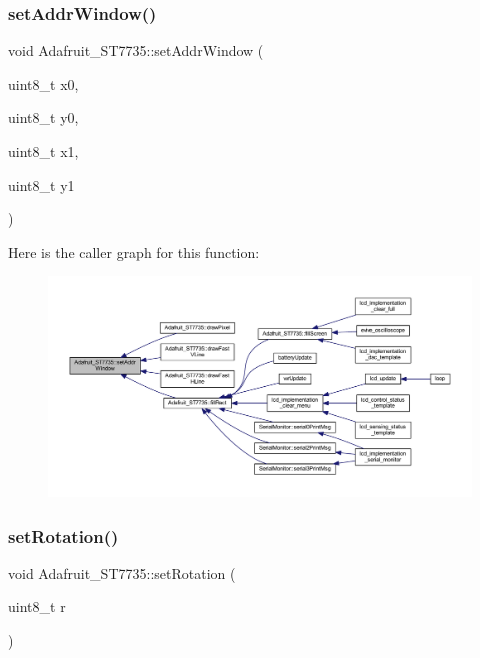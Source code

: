 \subsubsection{\texorpdfstring{set\+Addr\+Window()}{setAddrWindow()}}
{\footnotesize\ttfamily void Adafruit\+\_\+\+S\+T7735\+::set\+Addr\+Window (\begin{DoxyParamCaption}\item[{uint8\+\_\+t}]{x0,  }\item[{uint8\+\_\+t}]{y0,  }\item[{uint8\+\_\+t}]{x1,  }\item[{uint8\+\_\+t}]{y1 }\end{DoxyParamCaption})}

Here is the caller graph for this function\+:
\nopagebreak
\begin{figure}[H]
\begin{center}
\leavevmode
\includegraphics[width=350pt]{dd/dee/class_adafruit___s_t7735_ade48a8b2ba1e6375c5e3dbeaf84c44dd_icgraph}
\end{center}
\end{figure}
\mbox{\label{class_adafruit___s_t7735_aae15fa049e0aff62d58d8773182a87de}} 
\subsubsection{\texorpdfstring{set\+Rotation()}{setRotation()}}
{\footnotesize\ttfamily void Adafruit\+\_\+\+S\+T7735\+::set\+Rotation (\begin{DoxyParamCaption}\item[{uint8\+\_\+t}]{r }\end{DoxyParamCaption})}

